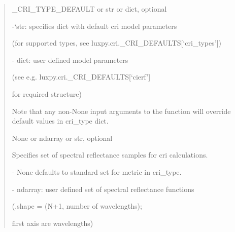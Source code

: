 \documentclass[letterpaper,10pt,english]{sphinxmanual}
\begin{document}
\begin{fulllineitems}
\begin{description}
\begin{quote}
\begin{description}
\item[{cri\_type}] \leavevmode
\begin{DUlineblock}{0em}
\item[] \_CRI\_TYPE\_DEFAULT or str or dict, optional
\item[]
\begin{DUlineblock}{\DUlineblockindent}
\item[] -‘str: specifies dict with default cri model parameters 
\item[]
\begin{DUlineblock}{\DUlineblockindent}
\item[] (for supported types, see luxpy.cri.\_CRI\_DEFAULTS{[}‘cri\_types’{]})
\end{DUlineblock}
\item[] - dict: user defined model parameters 
\item[]
\begin{DUlineblock}{\DUlineblockindent}
\item[] (see e.g. luxpy.cri.\_CRI\_DEFAULTS{[}‘cierf’{]} 
\item[] for required structure)
\end{DUlineblock}
\end{DUlineblock}
\item[] Note that any non-None input arguments to the function will 
override default values in cri\_type dict.
\end{DUlineblock}

\item[{sampleset}] \leavevmode
\begin{DUlineblock}{0em}
\item[] None or ndarray or str, optional
\item[] Specifies set of spectral reflectance samples for cri calculations.
\item[]
\begin{DUlineblock}{\DUlineblockindent}
\item[] - None defaults to standard set for metric in cri\_type.
\item[] - ndarray: user defined set of spectral reflectance functions 
\item[]
\begin{DUlineblock}{\DUlineblockindent}
\item[] (.shape = (N+1, number of wavelengths); 
\item[]
\begin{DUlineblock}{\DUlineblockindent}
\item[] first axis are wavelengths)
\end{DUlineblock}
\end{DUlineblock}
\end{DUlineblock}
\end{DUlineblock}


\end{description}
\end{quote}
\end{description}
\end{fulllineitems}
\end{document}

